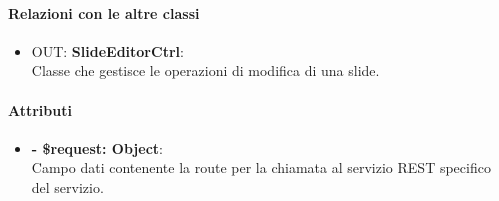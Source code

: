 		\paragraph{Relazioni con le altre classi}
		\begin{itemize}
			\item OUT: \textbf{SlideEditorCtrl}:\\
			Classe che gestisce le operazioni di modifica di una \gls{slide}.
		\end{itemize}
		
		\paragraph{Attributi}
		\begin{itemize}
			\item \textbf{- \$request: Object}:\\
			Campo dati contenente la route per la chiamata al servizio \gls{REST} specifico del servizio.
		\end{itemize}	
		
